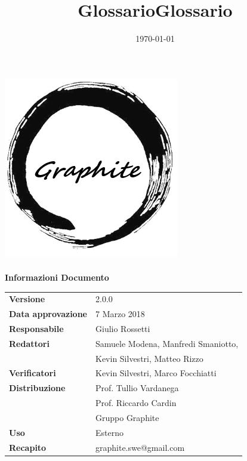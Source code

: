 \documentclass[openany,12pt,a4paper]{report}
\title{Glossario}
\author{}
\date{\today}
\title {Glossario}
\newcommand{\versione}{2.0.0}
\begin{document}
		
	\makeatletter
	\begin{titlepage}
		\setlength{\headsep}{0pt}  
		\begin{center}			
			\includegraphics[width=0.5\linewidth]{Logo.png}\\[1em]
			{\huge \bfseries  \@title }\\[10ex]
			\textbf{\Large Informazioni Documento} \\[2em]
			\bgroup
			\def\arraystretch{1.5}
			\begin{tabular}{l|l}
				\textbf{Versione} & \versione{} \\
				\textbf{Data approvazione} & 7 Marzo 2018 \\
				\textbf{Responsabile} & Giulio Rossetti \\
				\textbf{Redattori} & Samuele Modena, Manfredi Smaniotto,\\
				& Kevin Silvestri, Matteo Rizzo \\
				\textbf{Verificatori} & Kevin Silvestri, Marco Focchiatti \\
				\textbf{Distribuzione} & Prof. Tullio Vardanega \\
				& Prof. Riccardo Cardin \\
				& Gruppo Graphite \\
				\textbf{Uso} & Esterno \\
				\textbf{Recapito} & graphite.swe@gmail.com \\
			\end{tabular}
			\egroup
		\end{center}
	\end{titlepage}
	\makeatother
	
	\thispagestyle{empty}
	\newpage
	
	
	\tableofcontents
	\printglossary[style=glossaryStyle, nonumberlist]
\end{document}

